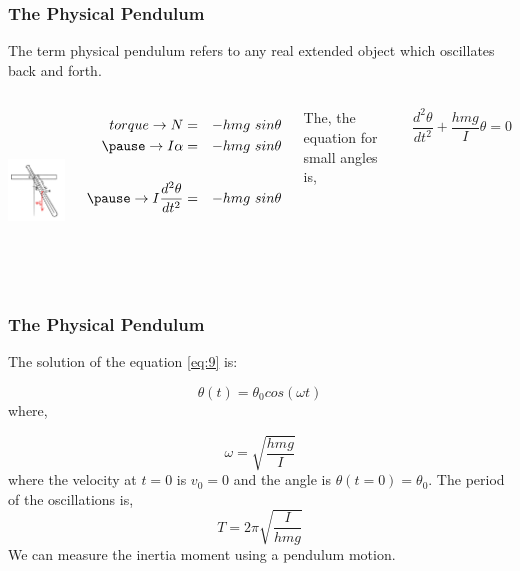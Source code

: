 \documentclass[]{beamer}
\begin{document}
\begin{frame}
\frametitle{The Physical Pendulum}

The term physical pendulum refers to any real extended object which oscillates back
and forth.


   \begin{columns}[c]
   \column{2in}  %
  

  \begin{center}
  \includegraphics[height=1.7in]{images3/physical_pendulum.jpg}
\end{center}


\pause
   \column{2.8in}

\begin{eqnarray*}
torque\rightarrow N&=&-hmg~sin\theta \\
\pause
\rightarrow I\alpha&=&-hmg~sin\theta \\
\\
\pause
\rightarrow I\frac{d^2\theta}{dt^2}&=&-hmg~sin\theta \\
\end{eqnarray*}
\pause

The, the equation for small angles is,

\pause

\begin{equation}
\frac{d^2\theta}{dt^2}+\frac{hmg}{I}\theta=0
\label{eq:9}
\end{equation}

   \end{columns}



\end{frame}





\begin{frame}
\frametitle{The Physical Pendulum}

The solution of the equation \ref{eq:9} is:

\begin{equation*}
\theta(t)=\theta_0 cos(\omega t)
\end{equation*}
\pause
where,

\begin{equation}
\omega= \sqrt{\frac{hmg}{I}}
\end{equation}
\pause
where the velocity at $t=0$ is $v_0=0$ and the angle is $\theta(t=0)=\theta_0$.
\pause
The period of the oscillations is,
\pause
\begin{equation}
T= 2\pi \sqrt{\frac{I}{hmg}}
\end{equation}
\pause
We can measure the inertia moment using a pendulum motion.

\end{frame}
\end{document}
